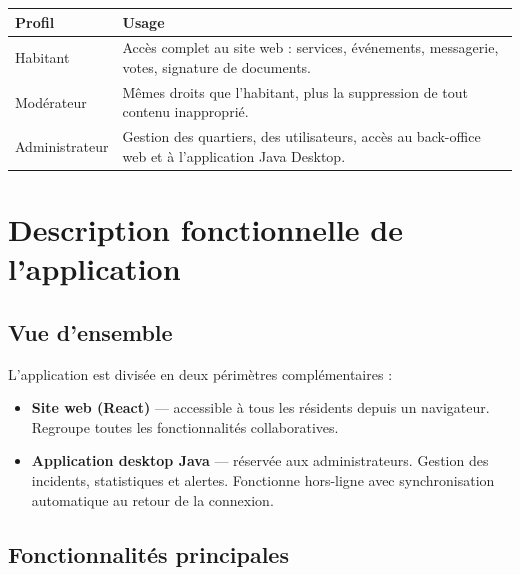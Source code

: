 \documentclass[12pt,a4paper]{article}
\begin{document}
\begin{center}
    \renewcommand{\arraystretch}{1.4}
    \begin{tabularx}{\linewidth}{p{3.2cm} X}
        \textbf{Profil} & \textbf{Usage}                                                                \\
        \midrule
        \rowcolor{rowalt}
        Habitant
                        & Accès complet au site web : services, événements, messagerie, votes,
        signature de documents.                                                                         \\
        Modérateur
                        & Mêmes droits que l'habitant, plus la suppression de tout contenu inapproprié. \\
        \rowcolor{rowalt}
        Administrateur
                        & Gestion des quartiers, des utilisateurs, accès au back-office web et
        à l'application Java Desktop.                                                                   \\
    \end{tabularx}
\end{center}

\newpage

\section{Description fonctionnelle de l'application}

\subsection{Vue d'ensemble}

L'application est divisée en deux périmètres complémentaires :

\begin{itemize}
    \item \textbf{Site web (React)} — accessible à tous les résidents depuis un
          navigateur. Regroupe toutes les fonctionnalités collaboratives.
    \item \textbf{Application desktop Java} — réservée aux administrateurs.
          Gestion des incidents, statistiques et alertes. Fonctionne hors-ligne
          avec synchronisation automatique au retour de la connexion.
\end{itemize}

\subsection{Fonctionnalités principales}
\end{document}
